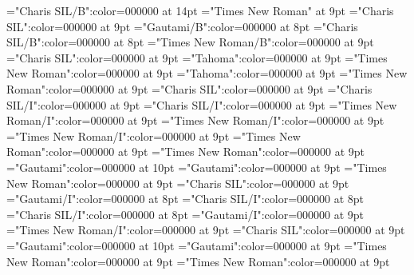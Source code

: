 \documentclass[gps1,twoside]{article}
\begin{document}
\font{}="Charis SIL/B":color=000000 at 14pt
\font{}="Times New Roman" at 9pt
\font\entryletDatadicBody="Charis SIL":color=000000 at 9pt
\font\headwordggoTeluINentryletDatadicBody="Gautami/B":color=000000 at 8pt
\font\headwordafterentryletDatadicBody="Charis SIL/B":color=000000 at 8pt
\font\spanenheadwordggoTeluINentryletDatadicBody="Times New Roman/B":color=000000 at 9pt
\font\spanentryletDatadicBody="Charis SIL":color=000000 at 9pt
\font\pronunciationggofonipaxemicspanentryletDatadicBody="Tahoma":color=000000 at 9pt
\font\spanenpronunciationggofonipaxemicspanentryletDatadicBody="Times New Roman":color=000000 at 9pt
\font\spanggofonipaxemicpronunciationggofonipaxemicspanentryletDatadicBody="Tahoma":color=000000 at 9pt
\font\spanenspanentryletDatadicBody="Times New Roman":color=000000 at 9pt
\font\sensespanentryletDatadicBody="Charis SIL":color=000000 at 9pt
\font\grammaticalinfosensespanentryletDatadicBody="Charis SIL/I":color=000000 at 9pt
\font\grammaticalinfoaftersensespanentryletDatadicBody="Charis SIL/I":color=000000 at 9pt
\font\partofspeechengrammaticalinfosensespanentryletDatadicBody="Times New Roman/I":color=000000 at 9pt
\font\spanenpartofspeechengrammaticalinfosensespanentryletDatadicBody="Times New Roman/I":color=000000 at 9pt
\font\spanengrammaticalinfosensespanentryletDatadicBody="Times New Roman/I":color=000000 at 9pt
\font{}="Times New Roman":color=000000 at 9pt
\font\spanendefinitionensensespanentryletDatadicBody="Times New Roman":color=000000 at 9pt
\font\LexSensepublishStemGlossPubLdtesensespanentryletDatadicBody="Gautami":color=000000 at 10pt
\font\spanteLexSensepublishStemGlossPubLdtesensespanentryletDatadicBody="Gautami":color=000000 at 9pt
\font\spanenLexSensepublishStemGlossPubLdtesensespanentryletDatadicBody="Times New Roman":color=000000 at 9pt
\font\spansensespanentryletDatadicBody="Charis SIL":color=000000 at 9pt
\font\exampleggoTeluINspansensespanentryletDatadicBody="Gautami/I":color=000000 at 8pt
\font\examplebeforespansensespanentryletDatadicBody="Charis SIL/I":color=000000 at 8pt
\font\exampleafterspansensespanentryletDatadicBody="Charis SIL/I":color=000000 at 8pt
\font\spanggoTeluINexampleggoTeluINspansensespanentryletDatadicBody="Gautami/I":color=000000 at 9pt
\font\spanenexampleggoTeluINspansensespanentryletDatadicBody="Times New Roman/I":color=000000 at 9pt
\font\spanspansensespanentryletDatadicBody="Charis SIL":color=000000 at 9pt
\font\translationLdtespanspansensespanentryletDatadicBody="Gautami":color=000000 at 10pt
\font\spantetranslationLdtespanspansensespanentryletDatadicBody="Gautami":color=000000 at 9pt
\font\spanentranslationLdtespanspansensespanentryletDatadicBody="Times New Roman":color=000000 at 9pt
\font\spanenspansensespanentryletDatadicBody="Times New Roman":color=000000 at 9pt
\end{document}
